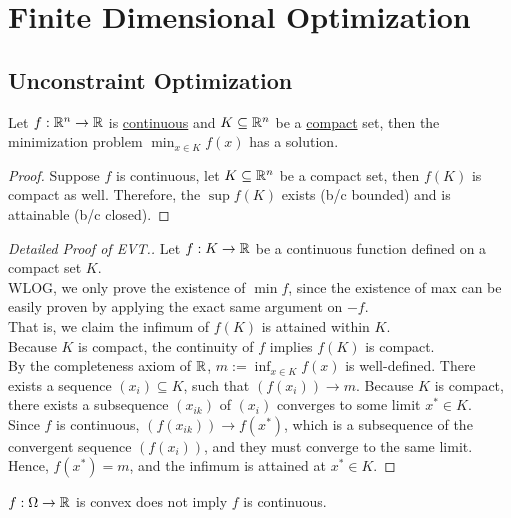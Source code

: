 \documentclass{article}
\begin{document}
	\section{Finite Dimensional Optimization}
	\subsection{Unconstraint Optimization}
    \begin{theorem}
        Let $f: \mathbb{R}^n \to \mathbb{R}$ is \ul{continuous} and $K \subseteq \mathbb{R}^n$ be a \ul{compact} set, then the minimization problem $\min_{x \in K} f(x)$ has a solution.
    \end{theorem}
    \begin{proof}
    	Suppose $f$ is continuous, let $K \subseteq \mathbb{R}^n$ be a compact set, then $f(K)$ is compact as well. Therefore, the $\sup f(K)$ exists (b/c bounded) and is attainable (b/c closed).
    \end{proof}

    \begin{proof}[Detailed Proof of EVT.]
    	Let $f: K \to \mathbb{R}$ be a continuous function defined on a compact set $K$.\\
    	WLOG, we only prove the existence of $\min f$, since the existence of max can be easily proven by applying the exact same argument on $-f$. \\
    	That is, we claim the infimum of $f(K)$ is attained within $K$. \\
    	Because $K$ is compact, the continuity of $f$ implies $f(K)$ is compact. \\
    	By the completeness axiom of $\mathbb{R}$, $m := \inf_{x \in K} f(x)$ is well-defined. There exists a sequence $(x_i) \subseteq K$, such that $(f(x_i)) \to m$. Because $K$ is compact, there exists a subsequence $(x_{ik})$ of $(x_i)$ converges to some limit $x^* \in K$. \\
    	Since $f$ is continuous, $(f(x_{ik})) \to f(x^*)$, which is a subsequence of the convergent sequence $(f(x_i))$, and they must converge to the same limit. Hence, $f(x^*) = m$, and the infimum is attained at $x^* \in K$.
    \end{proof}
    
    \begin{remark}
    	$f: \Omega \to \mathbb{R}$ is convex does not imply $f$ is continuous.
    \end{remark}
    
%    
    
\end{document}
